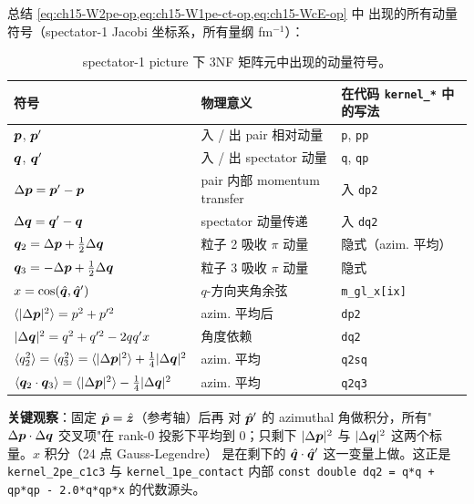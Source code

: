总结 \cref{eq:ch15-W2pe-op,eq:ch15-W1pe-ct-op,eq:ch15-WcE-op} 中
出现的所有动量符号（spectator-1 Jacobi 坐标系，所有量纲 fm\(^{-1}\)）：

\begin{table}[h]
\centering
\caption{spectator-1 picture 下 3NF 矩阵元中出现的动量符号。}
\label{tab:ch15-momentum-cheatsheet}
\begin{tabular}{l l l}
\toprule
符号 & 物理意义 & 在代码 \texttt{kernel\_*} 中的写法 \\
\midrule
\(\bm{p}\), \(\bm{p}'\) & 入 / 出 pair 相对动量 & \texttt{p}, \texttt{pp} \\
\(\bm{q}\), \(\bm{q}'\) & 入 / 出 spectator 动量 & \texttt{q}, \texttt{qp} \\
\(\Delta \bm{p} = \bm{p}' - \bm{p}\) & pair 内部 momentum transfer & 入 \texttt{dp2} \\
\(\Delta \bm{q} = \bm{q}' - \bm{q}\) & spectator 动量传递 & 入 \texttt{dq2} \\
\(\bm{q}_2 = \Delta \bm{p} + \tfrac{1}{2}\Delta \bm{q}\) & 粒子 2 吸收 \(\pi\) 动量 & 隐式（azim. 平均）\\
\(\bm{q}_3 = -\Delta \bm{p} + \tfrac{1}{2}\Delta \bm{q}\) & 粒子 3 吸收 \(\pi\) 动量 & 隐式 \\
\(x = \cos(\hat{\bm{q}}, \hat{\bm{q}}')\) & \(q\)-方向夹角余弦 & \texttt{m\_gl\_x[ix]} \\
\(\langle |\Delta \bm{p}|^2 \rangle = p^2 + p'^2\) & azim. 平均后 & \texttt{dp2} \\
\(|\Delta \bm{q}|^2 = q^2 + q'^2 - 2qq' x\) & 角度依赖 & \texttt{dq2} \\
\(\langle q_2^2 \rangle = \langle q_3^2 \rangle = \langle |\Delta \bm{p}|^2 \rangle + \tfrac{1}{4}|\Delta \bm{q}|^2\) & azim. 平均 & \texttt{q2sq} \\
\(\langle \bm{q}_2 \cdot \bm{q}_3 \rangle = \langle |\Delta \bm{p}|^2 \rangle - \tfrac{1}{4}|\Delta \bm{q}|^2\) & azim. 平均 & \texttt{q2q3} \\
\bottomrule
\end{tabular}
\end{table}

\textbf{关键观察}：固定 \(\hat{\bm{p}} = \hat{\bm{z}}\)（参考轴）后再
对 \(\hat{\bm{p}}'\) 的 azimuthal 角做积分，所有"\(\Delta \bm{p} \cdot
\Delta \bm{q}\) 交叉项"在 rank-0 投影下平均到 0；只剩下 \(|\Delta \bm{p}|^2\)
与 \(|\Delta \bm{q}|^2\) 这两个标量。\(x\) 积分（24 点 Gauss-Legendre）
是在剩下的 \(\hat{\bm{q}} \cdot \hat{\bm{q}}'\) 这一变量上做。这正是
\texttt{kernel\_2pe\_c1c3} 与 \texttt{kernel\_1pe\_contact} 内部
\texttt{const double dq2 = q*q + qp*qp - 2.0*q*qp*x} 的代数源头。

